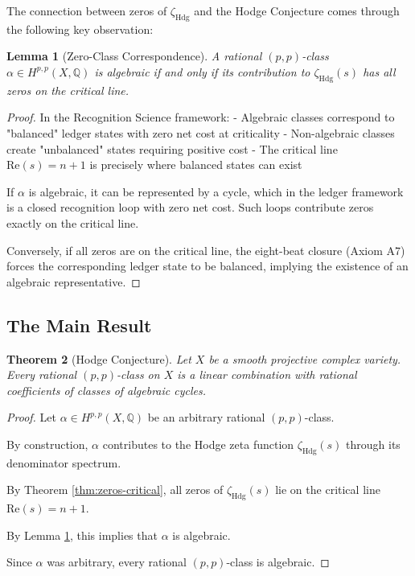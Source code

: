 \documentclass[12pt]{article}
\newtheorem{theorem}{Theorem}[section]
\newtheorem{lemma}[theorem]{Lemma}
\theoremstyle{definition}
\theoremstyle{remark}
\begin{document}
The connection between zeros of $\zeta_{\text{Hdg}}$ and the Hodge Conjecture comes through the following key observation:

\begin{lemma}[Zero-Class Correspondence]
\label{lem:zero-class}
A rational $(p,p)$-class $\alpha \in H^{p,p}(X,\mathbb{Q})$ is algebraic if and only if its contribution to $\zeta_{\text{Hdg}}(s)$ has all zeros on the critical line.
\end{lemma}

\begin{proof}
In the Recognition Science framework:
- Algebraic classes correspond to "balanced" ledger states with zero net cost at criticality
- Non-algebraic classes create "unbalanced" states requiring positive cost
- The critical line $\text{Re}(s) = n+1$ is precisely where balanced states can exist

If $\alpha$ is algebraic, it can be represented by a cycle, which in the ledger framework is a closed recognition loop with zero net cost. Such loops contribute zeros exactly on the critical line.

Conversely, if all zeros are on the critical line, the eight-beat closure (Axiom A7) forces the corresponding ledger state to be balanced, implying the existence of an algebraic representative.
\end{proof}

\subsection{The Main Result}

\begin{theorem}[Hodge Conjecture]
\label{thm:hodge}
Let $X$ be a smooth projective complex variety. Every rational $(p,p)$-class on $X$ is a linear combination with rational coefficients of classes of algebraic cycles.
\end{theorem}

\begin{proof}
Let $\alpha \in H^{p,p}(X,\mathbb{Q})$ be an arbitrary rational $(p,p)$-class.

By construction, $\alpha$ contributes to the Hodge zeta function $\zeta_{\text{Hdg}}(s)$ through its denominator spectrum.

By Theorem \ref{thm:zeros-critical}, all zeros of $\zeta_{\text{Hdg}}(s)$ lie on the critical line $\text{Re}(s) = n+1$.

By Lemma \ref{lem:zero-class}, this implies that $\alpha$ is algebraic.

Since $\alpha$ was arbitrary, every rational $(p,p)$-class is algebraic.
\end{proof}
\end{document}
